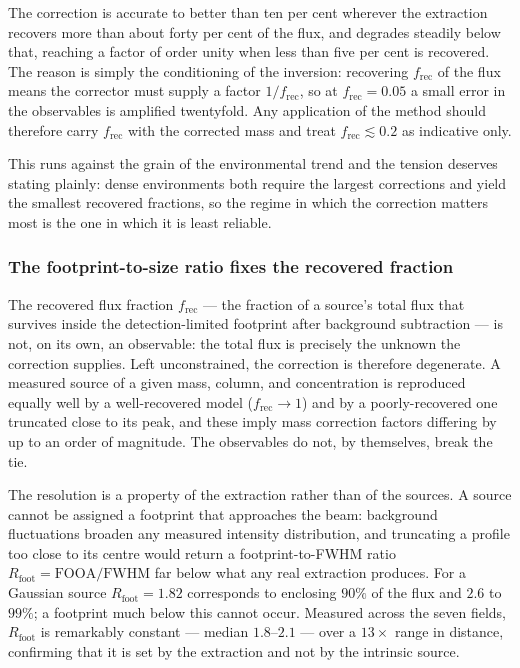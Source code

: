 \documentclass[11pt,a4paper]{article}
\begin{document}
The correction is accurate to better than ten per cent wherever the extraction
recovers more than about forty per cent of the flux, and degrades steadily
below that, reaching a factor of order unity when less than five per cent is
recovered. The reason is simply the conditioning of the inversion: recovering
$f_{\mathrm{rec}}$ of the flux means the corrector must supply a factor
$1/f_{\mathrm{rec}}$, so at $f_{\mathrm{rec}}=0.05$ a small error in the
observables is amplified twentyfold. Any application of the method should
therefore carry $f_{\mathrm{rec}}$ with the corrected mass and treat
$f_{\mathrm{rec}}\lesssim0.2$ as indicative only.

This runs against the grain of the environmental trend and the tension deserves
stating plainly: dense environments both require the largest corrections and
yield the smallest recovered fractions, so the regime in which the correction
matters most is the one in which it is least reliable.

\subsubsection{The footprint-to-size ratio fixes the recovered fraction}
\label{sec:footprint}

The recovered flux fraction $f_{\mathrm{rec}}$ --- the fraction of a source's
total flux that survives inside the detection-limited footprint after
background subtraction --- is not, on its own, an observable: the total flux is
precisely the unknown the correction supplies. Left unconstrained, the
correction is therefore degenerate. A measured source of a given mass, column,
and concentration is reproduced equally well by a well-recovered model
($f_{\mathrm{rec}}\!\to\!1$) and by a poorly-recovered one truncated close to
its peak, and these imply mass correction factors differing by up to an order
of magnitude. The observables do not, by themselves, break the tie.

The resolution is a property of the extraction rather than of the sources. A
source cannot be assigned a footprint that approaches the beam: background
fluctuations broaden any measured intensity distribution, and truncating a
profile too close to its centre would return a footprint-to-FWHM ratio
$R_{\mathrm{foot}}=\mathrm{FOOA}/\mathrm{FWHM}$ far below what any real
extraction produces. For a Gaussian source $R_{\mathrm{foot}}=1.82$ corresponds
to enclosing $90\%$ of the flux and $2.6$ to $99\%$; a footprint much below
this cannot occur. Measured across the seven fields, $R_{\mathrm{foot}}$ is
remarkably constant --- median $1.8$--$2.1$ --- over a $13\times$ range in
distance, confirming that it is set by the extraction and not by the intrinsic
source.
\end{document}
